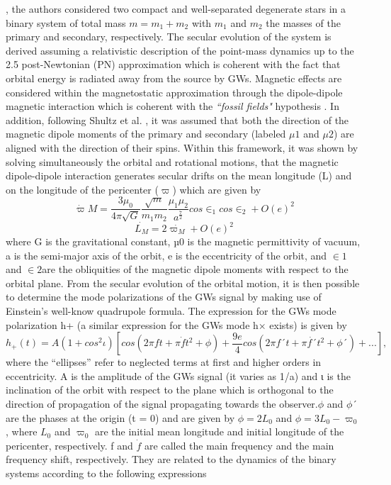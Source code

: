 \documentclass[a4paper,10.5pt]{article}
\begin{document}
, the authors considered two compact and well-separated degenerate stars in a binary system of total mass $m=m_1+m_2$ with $m_1$ and $m_2$ the masses of the primary and secondary, respectively. The secular evolution of the system is derived assuming a relativistic description of the point-mass dynamics up to the 2.5 post-Newtonian (PN) approximation  which is coherent with the fact that orbital energy is radiated away from the source by GWs. Magnetic effects are considered within the magnetostatic approximation through the dipole-dipole magnetic interaction which is coherent with the {\textit{``fossil fields"}} hypothesis . In addition, following Shultz et al. , it was assumed that both the direction of the magnetic dipole moments of the primary and secondary (labeled $\mu1$ and $\mu2$) are aligned with the direction of their spins. Within this framework, it was shown by solving simultaneously the orbital and rotational motions, that the magnetic dipole-dipole interaction generates secular drifts on the mean longitude (L) and on the longitude of the pericenter ($\varpi$) which are given by 
\begin{equation} \tag{2.1}
    \dot{\varpi} M=\frac{3\mu_0}{4\pi \sqrt{G}}\frac{\sqrt{m}}{m_1m_2} \frac{\mu_1 \mu_2 }{a^{\frac{7}{2}}} cos\in_1cos\in_2+O(e)^{2}
\end{equation}
\begin{equation}\tag{2.2}
    \dot{L_M}= 2\dot{\varpi_M}+O(e)^{2}
\end{equation}
where G is the gravitational constant, µ0 is the magnetic permittivity of vacuum, a is the semi-major axis of the orbit, e is the eccentricity of the orbit, and $\in1$ and $\in2$are the obliquities of the magnetic dipole moments with respect to the orbital plane. From the secular evolution of the orbital motion, it is then possible to determine the mode polarizations of the GWs signal by making use of Einstein’s well-know quadrupole formula. The expression for the GWs mode polarization h+ (a similar expression for the GWs mode h× exists) is given by
\begin{equation} \tag{2.3}
    h_+ (t) = A(1+cos^{2}\iota)[cos(2\pi ft+\pi\dot{f}t^{2}+ \phi)+\frac{9e}{4} cos (2\pi f´t+\pi\dot{f´}t^{2}+ \phi´)+ ...],
\end{equation}
where the “ellipses” refer to neglected terms at first and higher orders in eccentricity. A is the amplitude of the GWs signal (it varies as 1/a) and ι is the inclination of the orbit with respect to the plane which is orthogonal to the direction of propagation of the signal propagating towards the observer.$\phi$ and $ \phi ´$ are the phases at the origin (t = 0) and are given by $\phi = 2L_0$ and  $\phi = 3L_0 - \varpi_0$, where $L_0$ and $\varpi_0$ are the initial mean longitude and initial longitude of the pericenter, respectively. f and $\dot{f}$ are called the main frequency and the main frequency shift, respectively. They are related to the dynamics of the binary systems according to the following expressions
\end{document}

